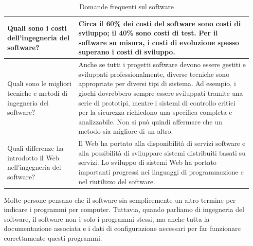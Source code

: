 \begin{table}[ht]
\begin{tabular}{|p{6cm}|p{9cm}|}
\hline
Quali sono i costi dell'ingegneria del software? & Circa il 60\% dei costi del software sono costi di sviluppo; il 40\% sono costi di test. Per il software su misura, i costi di evoluzione spesso superano i costi di sviluppo. \\
\hline
Quali sono le migliori tecniche e metodi di ingegneria del software? & Anche se tutti i progetti software devono essere gestiti e sviluppati professionalmente, diverse tecniche sono appropriate per diversi tipi di sistema. Ad esempio, i giochi dovrebbero sempre essere sviluppati tramite una serie di prototipi, mentre i sistemi di controllo critici per la sicurezza richiedono una specifica completa e analizzabile. Non si può quindi affermare che un metodo sia migliore di un altro. \\
\hline
Quali differenze ha introdotto il Web nell'ingegneria del software? & Il Web ha portato alla disponibilità di servizi software e alla possibilità di sviluppare sistemi distribuiti basati su servizi. Lo sviluppo di sistemi Web ha portato importanti progressi nei linguaggi di programmazione e nel riutilizzo del software. \\
\hline
\end{tabular}
\caption{Domande frequenti sul software}
\end{table}

Molte persone pensano che il software sia semplicemente un altro termine per indicare i programmi per computer. Tuttavia, quando parliamo di ingegneria del software, il software non è solo i programmi stessi, ma anche tutta la documentazione associata e i dati di configurazione necessari per far funzionare correttamente questi programmi.


